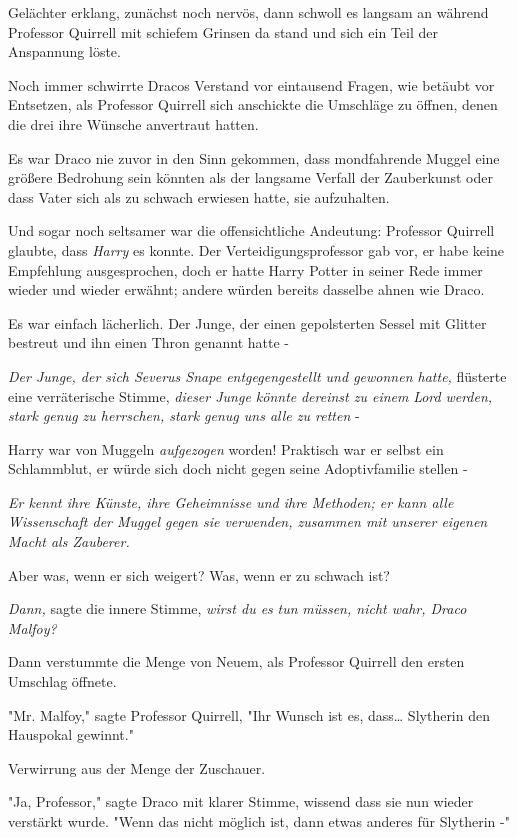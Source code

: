 {Gelächter erklang, zunächst noch nervös, dann schwoll es langsam an während Professor Quirrell mit schiefem Grinsen da stand und sich ein Teil der Anspannung löste.

\later

Noch immer schwirrte Dracos Verstand vor eintausend Fragen, wie betäubt vor Entsetzen, als Professor Quirrell sich anschickte die Umschläge zu öffnen, denen die drei ihre Wünsche anvertraut hatten.

Es war Draco nie zuvor in den Sinn gekommen, dass mondfahrende Muggel eine größere Bedrohung sein könnten als der langsame Verfall der Zauberkunst oder dass Vater sich als zu schwach erwiesen hatte, sie aufzuhalten.

Und sogar noch seltsamer war die offensichtliche Andeutung: Professor Quirrell glaubte, dass \emph{Harry} es konnte. Der Verteidigungsprofessor gab vor, er habe keine Empfehlung ausgesprochen, doch er hatte Harry Potter in seiner Rede immer wieder und wieder erwähnt; andere würden bereits dasselbe ahnen wie Draco.

Es war einfach lächerlich. Der Junge, der einen gepolsterten Sessel mit Glitter bestreut und ihn einen Thron genannt hatte -

\emph{Der Junge, der sich Severus Snape entgegengestellt und gewonnen hatte,} flüsterte eine verräterische Stimme, \emph{dieser Junge könnte} \emph{dereinst zu einem} \emph{Lord} \emph{werden, stark genug zu herrschen, stark genug uns alle zu retten} -

Harry war von Muggeln \emph{aufgezogen} worden! Praktisch war er selbst ein Schlammblut, er würde sich doch nicht gegen seine Adoptivfamilie stellen -

\emph{Er kennt ihre Künste, ihre Geheimnisse und ihre Methoden; er kann alle Wissenschaft der Muggel gegen sie verwenden, zusammen mit unserer eigenen Macht als Zauberer.}

Aber was, wenn er sich weigert? Was, wenn er zu schwach ist?

\emph{Dann,} sagte die innere Stimme, \emph{wirst du es} \emph{tun} \emph{müssen, nicht wahr, Draco Malfoy?}

Dann verstummte die Menge von Neuem, als Professor Quirrell den ersten Umschlag öffnete.

"Mr. Malfoy," sagte Professor Quirrell, "Ihr Wunsch ist es, dass… Slytherin den Hauspokal gewinnt."

Verwirrung aus der Menge der Zuschauer.

"Ja, Professor," sagte Draco mit klarer Stimme, wissend dass sie nun wieder verstärkt wurde. "Wenn das nicht möglich ist, dann etwas anderes für Slytherin -"

}
